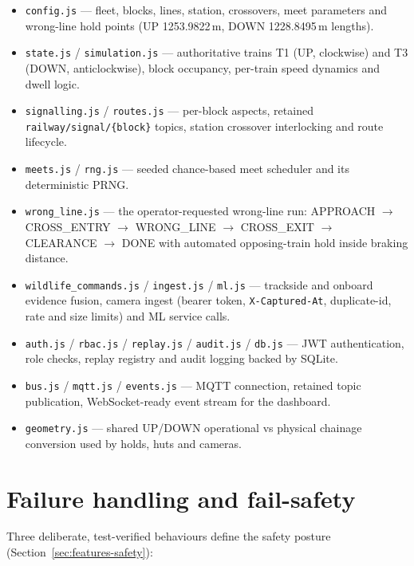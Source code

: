 \begin{itemize}
  \item \texttt{config.js} --- fleet, blocks, lines, station, crossovers,
        meet parameters and wrong-line hold points (UP 1253.9822\,m,
        DOWN 1228.8495\,m lengths).
  \item \texttt{state.js} / \texttt{simulation.js} --- authoritative
        trains T1 (UP, clockwise) and T3 (DOWN, anticlockwise), block
        occupancy, per-train speed dynamics and dwell logic.
  \item \texttt{signalling.js} / \texttt{routes.js} --- per-block aspects,
        retained \texttt{railway/signal/\{block\}} topics, station
        crossover interlocking and route lifecycle.
  \item \texttt{meets.js} / \texttt{rng.js} --- seeded chance-based meet
        scheduler and its deterministic PRNG.
  \item \texttt{wrong\_line.js} --- the operator-requested wrong-line
        run: APPROACH $\rightarrow$ CROSS\_ENTRY $\rightarrow$ WRONG\_LINE
        $\rightarrow$ CROSS\_EXIT $\rightarrow$ CLEARANCE $\rightarrow$ DONE
        with automated opposing-train hold inside braking distance.
  \item \texttt{wildlife\_commands.js} / \texttt{ingest.js} /
        \texttt{ml.js} --- trackside and onboard evidence fusion, camera
        ingest (bearer token, \texttt{X-Captured-At}, duplicate-id,
        rate and size limits) and ML service calls.
  \item \texttt{auth.js} / \texttt{rbac.js} / \texttt{replay.js} /
        \texttt{audit.js} / \texttt{db.js} --- JWT authentication, role
        checks, replay registry and audit logging backed by SQLite.
  \item \texttt{bus.js} / \texttt{mqtt.js} / \texttt{events.js} ---
        MQTT connection, retained topic publication, WebSocket-ready
        event stream for the dashboard.
  \item \texttt{geometry.js} --- shared UP/DOWN operational vs physical
        chainage conversion used by holds, huts and cameras.
\end{itemize}

\section{Failure handling and fail-safety}

Three deliberate, test-verified behaviours define the safety posture
(Section~\ref{sec:features-safety}):

